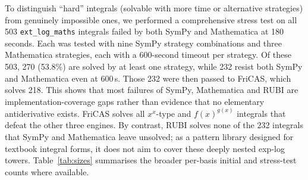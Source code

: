 \documentclass[preprint,12pt,authoryear]{elsarticle}
\newcommand{\codexadd}[1]{{\color{purple}#1}}
\newcommand{\hd}[1]{{\color{red}\textbf{[HD: #1]}}}
\begin{document}
To distinguish ``hard'' integrals (solvable with more time or alternative strategies) from genuinely impossible ones, we performed a comprehensive stress test on all 503 \texttt{ext\_log\_maths} integrals failed by both SymPy and Mathematica at 180 seconds. Each was tested with nine SymPy strategy combinations and three Mathematica strategies, each with a 600-second timeout per strategy. Of these 503, 270 (53.8\%) are solved by at least one strategy, while 232 resist both SymPy and Mathematica even at 600\,s. Those 232 were then passed to FriCAS, which solves 218.
\codexadd{This shows that most failures of SymPy, Mathematica and RUBI are implementation-coverage gaps rather than evidence that no elementary antiderivative exists. FriCAS solves all $x^x$-type and $f(x)^{g(x)}$ integrals that defeat the other three engines. By contrast, RUBI solves none of the 232 integrals that SymPy and Mathematica leave unsolved; as a pattern library designed for textbook integral forms, it does not aim to cover these deeply nested exp-log towers.}
Table~\ref{tab:sizes} summarises the broader per-basis initial and stress-test counts where available.
 
\end{document}
